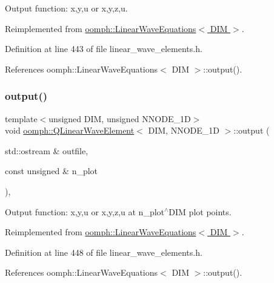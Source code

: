 Output function\+: x,y,u or x,y,z,u. 



Reimplemented from \hyperlink{classoomph_1_1LinearWaveEquations_ad5d68d2b3ec9fe3c6102ae91b9c61cc6}{oomph\+::\+Linear\+Wave\+Equations$<$ D\+I\+M $>$}.



Definition at line 443 of file linear\+\_\+wave\+\_\+elements.\+h.



References oomph\+::\+Linear\+Wave\+Equations$<$ D\+I\+M $>$\+::output().

\mbox{\label{classoomph_1_1QLinearWaveElement_a4e44576ef363b7b9680a60da96b7687b}} 
\subsubsection{\texorpdfstring{output()}{output()}\hspace{0.1cm}{\footnotesize\ttfamily [2/4]}}
{\footnotesize\ttfamily template$<$unsigned D\+IM, unsigned N\+N\+O\+D\+E\+\_\+1D$>$ \\
void \hyperlink{classoomph_1_1QLinearWaveElement}{oomph\+::\+Q\+Linear\+Wave\+Element}$<$ D\+IM, N\+N\+O\+D\+E\+\_\+1D $>$\+::output (\begin{DoxyParamCaption}\item[{std\+::ostream \&}]{outfile,  }\item[{const unsigned \&}]{n\+\_\+plot }\end{DoxyParamCaption})\hspace{0.3cm}{\ttfamily [inline]}, {\ttfamily [virtual]}}



Output function\+: x,y,u or x,y,z,u at n\+\_\+plot$^\wedge$\+D\+IM plot points. 



Reimplemented from \hyperlink{classoomph_1_1LinearWaveEquations_a1830b4405d4ab215e91e01914dd426f3}{oomph\+::\+Linear\+Wave\+Equations$<$ D\+I\+M $>$}.



Definition at line 448 of file linear\+\_\+wave\+\_\+elements.\+h.



References oomph\+::\+Linear\+Wave\+Equations$<$ D\+I\+M $>$\+::output().

